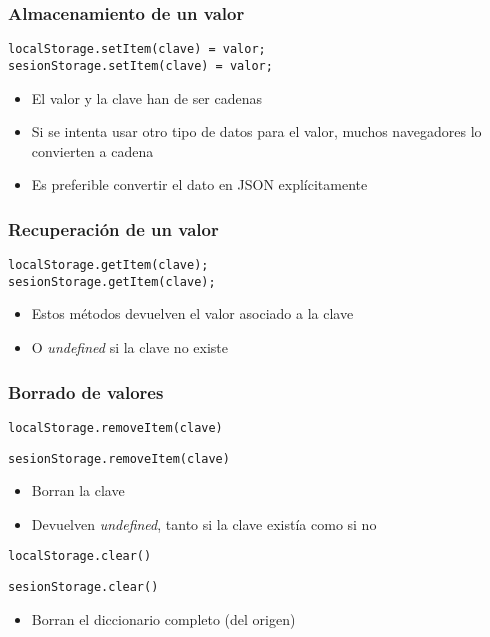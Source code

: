 \documentclass[ucs]{beamer}
\begin{document}
\begin{frame}[fragile]
\frametitle{Almacenamiento de un valor}


  \begin{verbatim}
localStorage.setItem(clave) = valor;
sesionStorage.setItem(clave) = valor;
  \end{verbatim}


\begin{itemize}
\item
El valor y la clave han de ser cadenas 

\item
Si se intenta usar otro tipo de datos para el valor,
muchos navegadores lo convierten a cadena 

\item
Es preferible convertir el dato en JSON explícitamente
\end{itemize}
\end{frame}


\begin{frame}[fragile]
\frametitle{Recuperación de un valor}


  \begin{verbatim}
localStorage.getItem(clave);
sesionStorage.getItem(clave);
  \end{verbatim}

\begin{itemize}
\item
Estos métodos devuelven el valor asociado a la clave

\item
O \emph{undefined} si la clave no existe
\end{itemize}
\end{frame}


\begin{frame}[fragile]
\frametitle{Borrado de valores}

\verb|localStorage.removeItem(clave)|

\verb|sesionStorage.removeItem(clave)|

    \begin{itemize}
    \item
Borran la clave
    \item
Devuelven 
\emph{undefined}, tanto si la clave existía como si no
    \end{itemize}


\verb|localStorage.clear()|

\verb|sesionStorage.clear()|

\begin{itemize}
\item
Borran el diccionario completo (del origen)
\end{itemize}
\end{frame}
\end{document}
